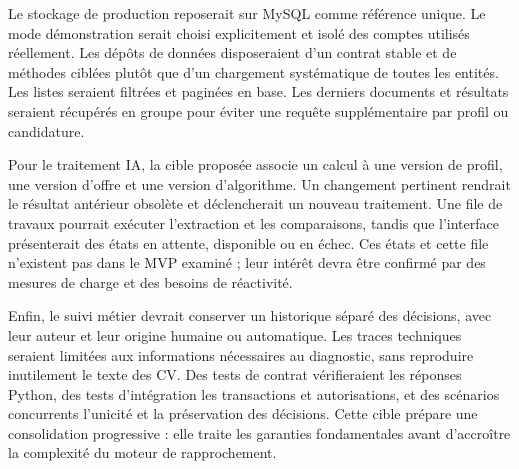 Le stockage de production reposerait sur MySQL comme référence unique. Le mode démonstration serait choisi explicitement et isolé des comptes utilisés réellement. Les dépôts de données disposeraient d'un contrat stable et de méthodes ciblées plutôt que d'un chargement systématique de toutes les entités. Les listes seraient filtrées et paginées en base. Les derniers documents et résultats seraient récupérés en groupe pour éviter une requête supplémentaire par profil ou candidature.

Pour le traitement IA, la cible proposée associe un calcul à une version de profil, une version d'offre et une version d'algorithme. Un changement pertinent rendrait le résultat antérieur obsolète et déclencherait un nouveau traitement. Une file de travaux pourrait exécuter l'extraction et les comparaisons, tandis que l'interface présenterait des états en attente, disponible ou en échec. Ces états et cette file n'existent pas dans le MVP examiné ; leur intérêt devra être confirmé par des mesures de charge et des besoins de réactivité.

Enfin, le suivi métier devrait conserver un historique séparé des décisions, avec leur auteur et leur origine humaine ou automatique. Les traces techniques seraient limitées aux informations nécessaires au diagnostic, sans reproduire inutilement le texte des CV. Des tests de contrat vérifieraient les réponses Python, des tests d'intégration les transactions et autorisations, et des scénarios concurrents l'unicité et la préservation des décisions. Cette cible prépare une consolidation progressive : elle traite les garanties fondamentales avant d'accroître la complexité du moteur de rapprochement.
